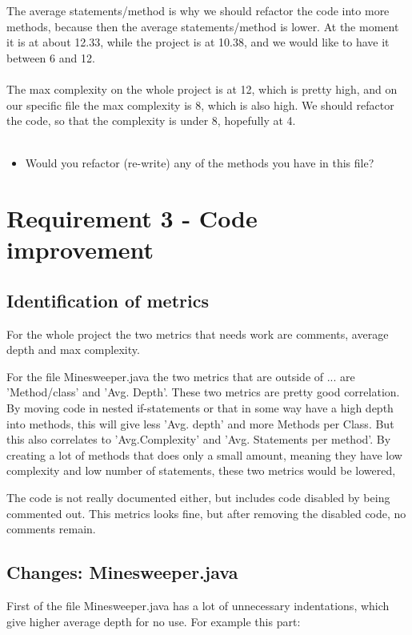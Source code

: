 \documentclass[UKenglish]{article}  %
\begin{document}
The average statements/method is why we should refactor the code into more methods, because then the average statements/method is lower. At the moment it is at about 12.33, while the project is at 10.38, and we would like to have it between 6 and 12. \\\\
The max complexity on the whole project is at 12, which is pretty high, and on our specific file the max complexity is 8, which is also high. We should refactor the code, so that the complexity is under 8, hopefully at 4. \\\\

\begin{itemize}
\item Would you refactor (re-write) any of the methods you have in this file?
\end{itemize}

\section{Requirement 3 - Code improvement}
\subsection{Identification of metrics}
For the whole project the two metrics that needs work are comments, average
depth and max complexity. 

For the file Minesweeper.java the two metrics that are outside of ... are 
'Method/class' and 'Avg. Depth'. These two metrics are pretty good correlation.
By moving code in nested if-statements or that in some way have a high depth 
into methods, this will give less 'Avg. depth' and more Methods per Class. 
But this also correlates to 'Avg.Complexity' and 'Avg. Statements per method'.
By creating a lot of methods that does only a small amount, meaning they have
low complexity and low number of statements, these two metrics would be lowered,

The code is not really documented either, but includes code disabled by being
commented out. This metrics looks fine, but after removing the disabled code,
no comments remain.

\subsection{Changes: Minesweeper.java}
First of the file Minesweeper.java has a lot of unnecessary indentations, which
give higher average depth for no use. For example this part:
\end{document}
